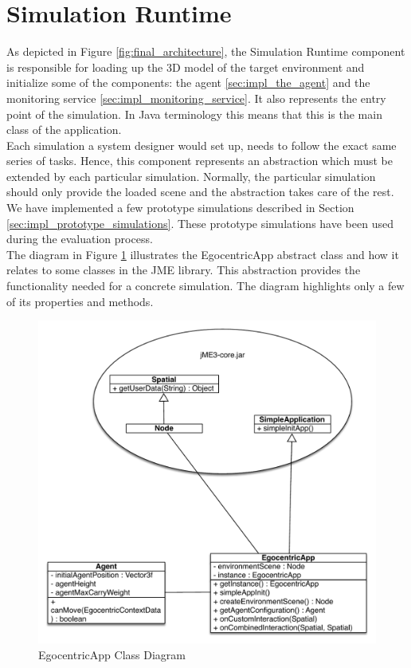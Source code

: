 \section{Simulation Runtime} %
\label{sec:impl_simulation_runtime}
As depicted in Figure \ref{fig:final_architecture}, the Simulation Runtime component is responsible for loading up the 3D model of the target environment and initialize some of the components: the agent \ref{sec:impl_the_agent} and the monitoring service \ref{sec:impl_monitoring_service}. It also represents the entry point of the simulation. In Java terminology this means that this is the main class of the application.\\

Each simulation a system designer would set up, needs to follow the exact same series of tasks. Hence, this component represents an abstraction which must be extended by each particular simulation. Normally, the particular simulation should only provide the loaded scene and the abstraction takes care of the rest. We have implemented a few prototype simulations described in Section \ref{sec:impl_prototype_simulations}. These prototype simulations have been used during the evaluation process.\\

The diagram in Figure \ref{fig:impl_ego_app} illustrates the EgocentricApp abstract class and how it relates to some classes in the JME library. This abstraction provides the functionality needed for a concrete simulation. The diagram highlights only a few of its properties and methods.
\begin{figure}[H]
	\centering
	\includegraphics[width=\linewidth]{gfx/Chapter4/ego_app}
	\caption{EgocentricApp Class Diagram}
	\label{fig:impl_ego_app}
\end{figure}

